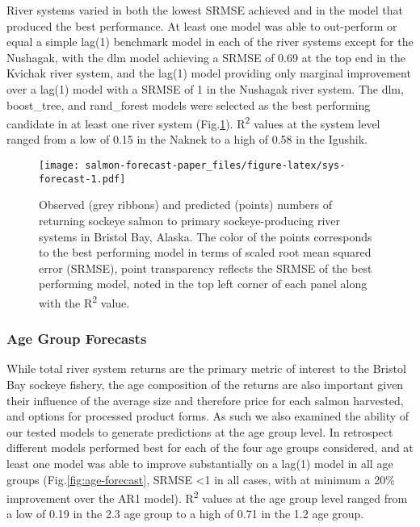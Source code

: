 \documentclass[
]{article}
\begin{document}
River systems varied in both the lowest SRMSE achieved and in the model that produced the best performance. At least one model was able to out-perform or equal a simple lag(1) benchmark model in each of the river systems except for the Nushagak, with the dlm model achieving a SRMSE of 0.69 at the top end in the Kvichak river system, and the lag(1) model providing only marginal improvement over a lag(1) model with a SRMSE of 1 in the Nushagak river system. The dlm, boost\_tree, and rand\_forest models were selected as the best performing candidate in at least one river system (Fig.\ref{fig:sys-forecast}). R\textsuperscript{2} values at the system level ranged from a low of 0.15 in the Naknek to a high of 0.58 in the Igushik.

\begin{figure}
\centering
\texttt{[image: salmon-forecast-paper\_files/figure-latex/sys-forecast-1.pdf]}
\caption{\label{fig:sys-forecast}Observed (grey ribbons) and predicted (points) numbers of returning sockeye salmon to primary sockeye-producing river systems in Bristol Bay, Alaska. The color of the points corresponds to the best performing model in terms of scaled root mean squared error (SRMSE), point transparency reflects the SRMSE of the best performing model, noted in the top left corner of each panel along with the R\textsuperscript{2} value.}
\end{figure}

\hypertarget{age-group-forecasts}{%
\subsubsection{Age Group Forecasts}\label{age-group-forecasts}}

While total river system returns are the primary metric of interest to the Bristol Bay sockeye fishery, the age composition of the returns are also important given their influence of the average size and therefore price for each salmon harvested, and options for processed product forms. As such we also examined the ability of our tested models to generate predictions at the age group level. In retrospect different models performed best for each of the four age groups considered, and at least one model was able to improve substantially on a lag(1) model in all age groups (Fig.\ref{fig:age-forecast}, SRMSE \textless1 in all cases, with at minimum a 20\% improvement over the AR1 model). R\textsuperscript{2} values at the age group level ranged from a low of 0.19 in the 2.3 age group to a high of 0.71 in the 1.2 age group.
\end{document}
